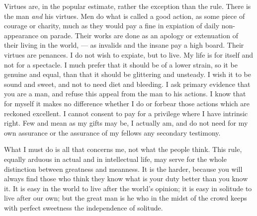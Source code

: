 \documentclass{article}
\begin{document}
Virtues are, in the popular estimate, rather the exception than the rule.
There is the man {\it and} his virtues. Men do what is called a good action, as
some piece of courage or charity, much as they would pay a fine in expiation
of daily non-appearance on parade. Their works are done as an apology or
extenuation of their living in the world, --- as invalids and the insane pay
a high board. Their virtues are penances. I do not wish to expiate, but to
live. My life is for itself and not for a spectacle. I much prefer that it
should be of a lower strain, so it be genuine and equal, than that it should
be glittering and unsteady. I wish it to be sound and sweet, and not to need
diet and bleeding. I ask primary evidence that you are a man, and refuse
this appeal from the man to his actions. I know that for myself it makes no
difference whether I do or forbear those actions which are reckoned
excellent. I cannot consent to pay for a privilege where I have intrinsic
right. Few and mean as my gifts may be, I actually am, and do not need for
my own assurance or the assurance of my fellows any secondary testimony.

What I must do is all that concerns me, not what the people think. This
rule, equally arduous in actual and in intellectual life, may serve for the
whole distinction between greatness and meanness. It is the harder, because
you will always find those who think they know what is your duty better than
you know it. It is easy in the world to live after the world's opinion; it
is easy in solitude to live after our own; but the great man is he who in
the midst of the crowd keeps with perfect sweetness the independence of
solitude.
\end{document}
